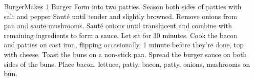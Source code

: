 \documentclass[]{article}
\title{}
\author{}
\begin{document}
\begin{recipe}{Burger}{}{Makes 1 Burger}
	Form into two patties. Season both sides of patties with salt and pepper
	Sauté until tender and slightly browned. 
	Remove onions from pan and saute mushrooms. 
	Sauté onions until translucent and combine with remaining ingredients to form a sauce. Let sit for 30 minutes. 
	Cook the bacon and patties on cast iron, flipping occasionally. 1 minute before they're done, top with cheese. Toast the buns on a non-stick pan. Spread the burger sauce on both sides of the buns. Place bacon, lettuce, patty, bacon, patty, onions, mushrooms on bun. 
\end{recipe}
\end{document}
